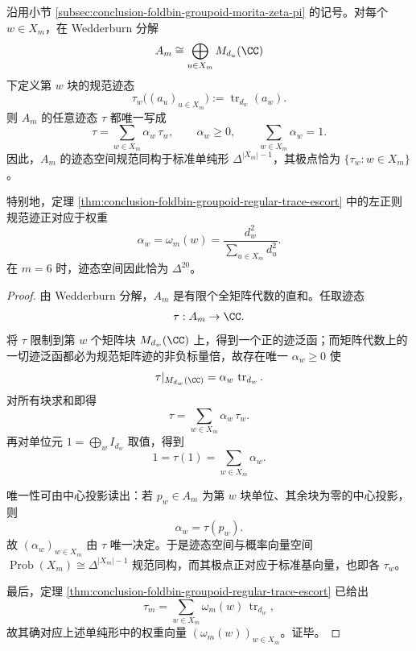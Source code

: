 \begin{theorem}[纤维群胚代数的迹态单纯形]\label{thm:conclusion-foldbin-groupoid-tracial-simplex}
沿用小节 \ref{subsec:conclusion-foldbin-groupoid-morita-zeta-pi} 的记号。对每个 \(w\in X_m\)，在 Wedderburn 分解
\[
A_m\cong \bigoplus_{u\in X_m}M_{d_u}(\CC)
\]
下定义第 \(w\) 块的规范迹态
\[
\tau_w\bigl((a_u)_{u\in X_m}\bigr):=\operatorname{tr}_{d_w}(a_w).
\]
则 \(A_m\) 的任意迹态 \(\tau\) 都唯一写成
\[
\tau=\sum_{w\in X_m}\alpha_w\,\tau_w,
\qquad
\alpha_w\ge 0,
\qquad
\sum_{w\in X_m}\alpha_w=1.
\]
因此，\(A_m\) 的迹态空间规范同构于标准单纯形 \(\Delta^{|X_m|-1}\)，其极点恰为 \(\{\tau_w:w\in X_m\}\)。

特别地，定理 \ref{thm:conclusion-foldbin-groupoid-regular-trace-escort} 中的左正则规范迹正对应于权重
\[
\alpha_w=\omega_m(w)=\frac{d_w^2}{\sum_{u\in X_m}d_u^2}.
\]
在 \(m=6\) 时，迹态空间因此恰为 \(\Delta^{20}\)。
\end{theorem}
\begin{proof}
由 Wedderburn 分解，\(A_m\) 是有限个全矩阵代数的直和。任取迹态
\[
\tau:A_m\to \CC.
\]
将 \(\tau\) 限制到第 \(w\) 个矩阵块 \(M_{d_w}(\CC)\) 上，得到一个正的迹泛函；而矩阵代数上的一切迹泛函都必为规范矩阵迹的非负标量倍，故存在唯一 \(\alpha_w\ge 0\) 使
\[
\tau|_{M_{d_w}(\CC)}=\alpha_w\,\operatorname{tr}_{d_w}.
\]
对所有块求和即得
\[
\tau=\sum_{w\in X_m}\alpha_w\,\tau_w.
\]
再对单位元 \(1=\bigoplus_w I_{d_w}\) 取值，得到
\[
1=\tau(1)=\sum_{w\in X_m}\alpha_w.
\]

唯一性可由中心投影读出：若 \(p_w\in A_m\) 为第 \(w\) 块单位、其余块为零的中心投影，则
\[
\alpha_w=\tau(p_w).
\]
故 \((\alpha_w)_{w\in X_m}\) 由 \(\tau\) 唯一决定。于是迹态空间与概率向量空间 \(\operatorname{Prob}(X_m)\cong\Delta^{|X_m|-1}\) 规范同构，而其极点正对应于标准基向量，也即各 \(\tau_w\)。

最后，定理 \ref{thm:conclusion-foldbin-groupoid-regular-trace-escort} 已给出
\[
\tau_m=\sum_{w\in X_m}\omega_m(w)\,\operatorname{tr}_{d_w},
\]
故其确对应上述单纯形中的权重向量 \((\omega_m(w))_{w\in X_m}\)。证毕。
\end{proof}
